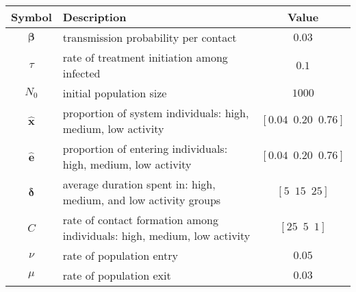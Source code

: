 \begin{tabular}{clc}
	\toprule
	    Symbol     & Description                                                             &                 Value                  \\
	\midrule
	 $\bm{\beta}$  & transmission probability per contact                                    &                 $0.03$                 \\
	    $\tau$     & rate of treatment initiation among infected                             &                 $0.1$                  \\
	    $N_0$      & initial population size                                                 &                 $1000$                 \\
	\midrule
	$\bm{\hat{x}}$ & proportion of system individuals: high, medium, low activity            & $[ 0.04 \enspace 0.20 \enspace 0.76 ]$ \\
	$\bm{\hat{e}}$ & proportion of entering individuals: high, medium, low activity          & $[ 0.04 \enspace 0.20 \enspace 0.76 ]$ \\
	$\bm{\delta}$  & average duration spent in: high, medium, and low activity groups        &    $[ 5 \enspace 15 \enspace 25 ]$     \\
	     $C$       & rate of contact formation among individuals: high, medium, low activity &     $[ 25 \enspace 5 \enspace 1 ]$     \\
	    $\nu$      & rate of population entry                                                &                 $0.05$                 \\
	    $\mu$      & rate of population exit                                                 &                 $0.03$                 \\
	\bottomrule
\end{tabular}
